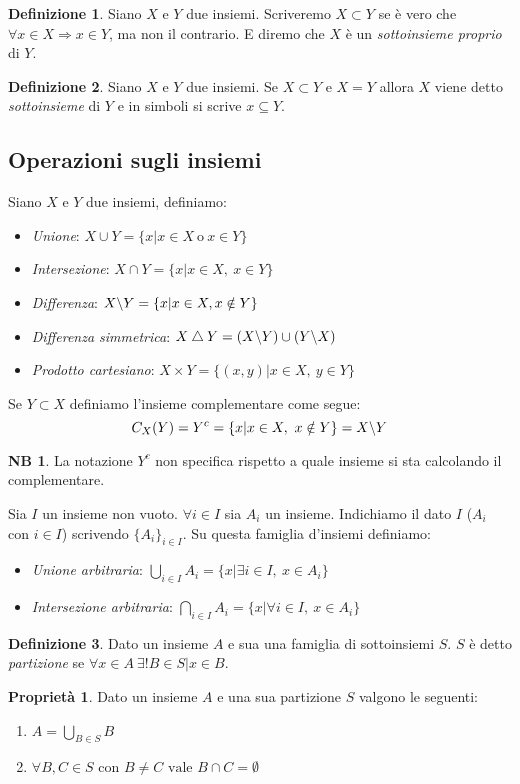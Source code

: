 \documentclass[12pt, a4paper]{report}
\theoremstyle{definition}
\newtheorem{definition}{Definizione}[section]
\newtheorem*{property}{Proprietà}
\newtheorem*{note}{NB}
\begin{document}
\begin{definition}
	Siano $X$ e $Y$ due insiemi. Scriveremo $X\subset Y$ se è vero che 
	$\forall x\in X \Rightarrow x\in Y$, ma non il contrario. E diremo che $X$
	è un \emph{sottoinsieme proprio} di $Y$.
\end{definition}
\begin{definition}
	Siano $X$ e $Y$ due insiemi. Se $X\subset Y$ e $X=Y$ allora $X$ viene detto
	\emph{sottoinsieme} di $Y$ e in simboli si scrive $x\subseteq Y$.
\end{definition}

\subsection{Operazioni sugli insiemi}
Siano $X$ e $Y$ due insiemi, definiamo:
\begin{itemize}
	\item \emph{Unione}: \(X\cup Y = \{x | x\in X\ \text{o}\ x\in Y\}\)
	\item \emph{Intersezione}: \(X\cap Y = \{x | x\in X,\ x\in Y\}\)
	\item \emph{Differenza}: \(X \symbol{92} Y = \{x | x\in X, x\notin Y\}\)
	\item \emph{Differenza simmetrica}: \(X\bigtriangleup Y = (X \symbol{92} Y) \cup (Y \symbol{92} X) \)
	\item \emph{Prodotto cartesiano}: \(X\times Y = \{(x, y) | x\in X,\ y\in Y\}\)
\end{itemize}

\noindent
Se \(Y\subset X\) definiamo l'insieme complementare come segue:
\[C_X(Y) = Y^c = \{x | x\in X,\ x\notin Y\} = X \symbol{92} Y\]
\begin{note}
	La notazione $Y^c$ non specifica rispetto a quale insieme si sta calcolando 
	il complementare.
\end{note}

\noindent
Sia $I$ un insieme non vuoto. \(\forall i\in I \) sia $A_i$ un insieme.
Indichiamo il dato $I$ ($A_i$ con $i\in I$) scrivendo \(\{A_i\}_{i\in I} \).
Su questa famiglia d'insiemi definiamo:
\begin{itemize}
	\item \emph{Unione arbitraria}: \(\bigcup_{i\in I}A_i=\{x|\exists i\in I,\ x\in A_i\}\)
	\item \emph{Intersezione arbitraria}: \(\bigcap_{i\in I}A_i=\{x|\forall i\in I,\ x\in A_i\}\)
\end{itemize}

\noindent
\begin{definition}
	Dato un insieme $A$ e sua una famiglia di sottoinsiemi $S$.
	$S$ è detto \emph{partizione} se \(\forall x\in A\ \exists!B\in S | x\in B\).
\end{definition}
\begin{property}
	Dato un insieme $A$ e una sua partizione $S$ valgono le seguenti:
	\begin{enumerate}[label=(\roman*)]
		\item \(A = \bigcup_{B\in S}B\)
		\item \(\forall B, C\in S\text{ con }B\neq C\text{ vale }B\cap C=
		\emptyset\)
	\end{enumerate}
\end{property}
\end{document}
